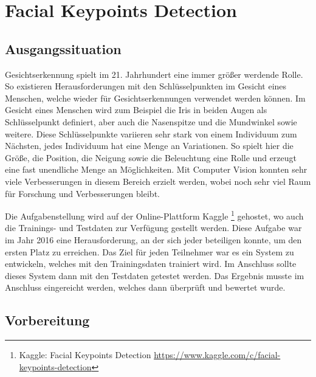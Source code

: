 \chapter{Facial Keypoints Detection}
\label{cha:Facial Keypoints Detection}

\section{Ausgangssituation}

Gesichtserkennung spielt im 21. Jahrhundert eine immer größer werdende Rolle. 
So existieren Herausforderungen mit den Schlüsselpunkten im Gesicht eines Menschen, welche wieder für Gesichtserkennungen verwendet werden können. 
Im Gesicht eines Menschen wird zum Beispiel die Iris in beiden Augen als Schlüsselpunkt definiert, aber auch die Nasenspitze und die Mundwinkel sowie weitere.
Diese Schlüsselpunkte variieren sehr stark von einem Individuum zum Nächsten, jedes Individuum hat eine Menge an Variationen. 
So spielt hier die Größe, die Position, die Neigung sowie die Beleuchtung eine Rolle und erzeugt eine fast unendliche Menge an Möglichkeiten. 
Mit Computer Vision konnten sehr viele Verbesserungen in diesem Bereich erzielt werden, wobei noch sehr viel Raum für Forschung und Verbesserungen bleibt. \newline

\noindent
Die Aufgabenstellung wird auf der Online-Plattform Kaggle \footnote{Kaggle: Facial Keypoints Detection \url{https://www.kaggle.com/c/facial-keypoints-detection}} gehostet, wo auch die Trainings- und Testdaten zur Verfügung gestellt werden. 
Diese Aufgabe war im Jahr 2016 eine Herausforderung, an der sich jeder beteiligen konnte, um den ersten Platz zu erreichen. 
Das Ziel für jeden Teilnehmer war es ein System zu entwickeln, welches mit den Trainingsdaten trainiert wird.
Im Anschluss sollte dieses System dann mit den Testdaten getestet werden. 
Das Ergebnis musste im Anschluss eingereicht werden, welches dann überprüft und bewertet wurde. 

\section{Vorbereitung}

